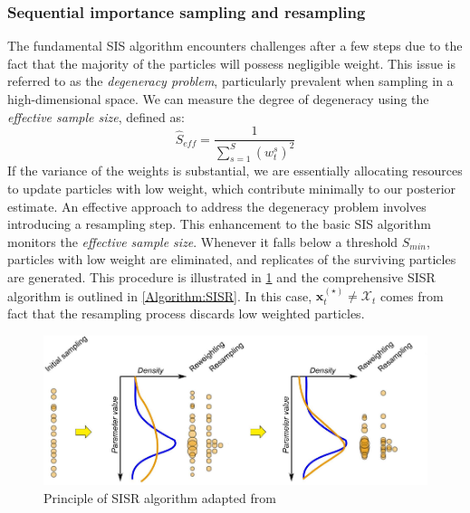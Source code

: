 \subsubsection{Sequential importance sampling and resampling}
The fundamental \acrshort{SIS} algorithm encounters challenges after a few steps due to the fact that the majority of the particles will possess negligible weight. This issue is referred to as the \textit{degeneracy problem}, particularly prevalent when sampling in a high-dimensional space. We can measure the degree of degeneracy using the \textit{effective sample size}, defined as:
\begin{equation}
    \label{eq: SISR_Seff}
\hat{S}_{eff}=
\frac{1}{\sum_{s=1}^{S} 
(w_{t}^{s})^2
} 
\end{equation}
If the variance of the weights is substantial, we are essentially allocating resources to update particles with low weight, which contribute minimally to our posterior estimate. An effective approach to address the degeneracy problem involves introducing a resampling step. This enhancement to the basic \acrshort{SIS} algorithm monitors the \textit{effective sample size}. Whenever it falls below a threshold $S_{min}$, particles with low weight are eliminated, and replicates of the surviving particles are generated. This procedure is illustrated in \cref{fig: PF-SISR} and the comprehensive \acrshort{SISR} algorithm is outlined in \ref{Algorithm:SISR}. In this case, $\boldsymbol{x}_{t}^{(\star)} \neq \mathcal{X}_{t}$ comes from fact that the resampling process discards low weighted particles.


\begin{figure}[H]
    \centering
    \includegraphics[width = 140mm]{Figures/figure-PF-SISR.pdf}
\caption{Principle of \acrshort{SISR} algorithm adapted from \protect\cite{speich2021}}
\label{fig: PF-SISR}
\end{figure}

